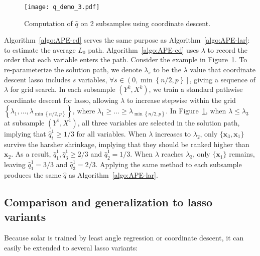 \documentclass[11pt,review,authoryear]{elsarticle}
\begin{document}
\begin{figure}[ht]
  \centering
  \texttt{[image: q\_demo\_3.pdf]}
  \caption{Computation of $\widehat{q}$ on 2 subsamples using coordinate descent.}
  \label{fig:q_demo_3}
\end{figure}

Algorithm~\ref{algo:APE-cd} serves the same purpose as Algorithm~\ref{algo:APE-lar}: to estimate the average $L_0$ path. Algorithm~\ref{algo:APE-cd} uses $\lambda$ to record the order that each variable enters the path. Consider the example in Figure~\ref{fig:q_demo_3}. To re-parameterize the solution path, we denote $\lambda_s$ to be the $\lambda$ value that coordinate descent lasso includes $s$ variables, $\forall s\in \left( 0, \min \left\{ n/2, p \right\} \right]$, giving a sequence of $\lambda$ for grid search. In each subsample $\left( Y^k, X^k \right)$, we train a standard pathwise coordinate descent for lasso, allowing $\lambda$ to increase stepwise within the grid $\left\{\lambda_1, \ldots, \lambda_{ \min \left\{ n/2, p \right\} } \right\}$, where $\lambda_1 \geqslant \ldots \geqslant \lambda_{ \min \left\{ n/2, p \right\} }$. In Figure~\ref{fig:q_demo_3}, when $\lambda \leqslant \lambda_3$ at subsample $\left( Y^1, X^1 \right)$, all three variables are selected in the solution path, implying that $\widehat{q}^1_i \geqslant 1/3$ for all variables. When $\lambda$ increases to $\lambda_2$, only $\{\mathbf{x}_3, \mathbf{x}_1\}$ survive the harsher shrinkage, implying that they should be ranked higher than $\mathbf{x}_2$. As a result, $\widehat{q}^1_1, \widehat{q}^1_3 \geqslant 2/3$ and $\widehat{q}^1_2 = 1/3$. When $\lambda$ reaches $\lambda_3$, only $\{\mathbf{x}_1\}$ remains, leaving $\widehat{q}^1_1 = 3/3$ and $\widehat{q}^1_3 = 2/3$. Applying the same method to each subsample produces the same $\widehat{q}$ as Algorithm~\ref{algo:APE-lar}.

\subsection{Comparison and generalization to lasso variants \label{subsection:variant}}
\label{subsec:variant}

Because solar is trained by least angle regression or coordinate descent, it can easily be extended to several lasso variants:
\end{document}
